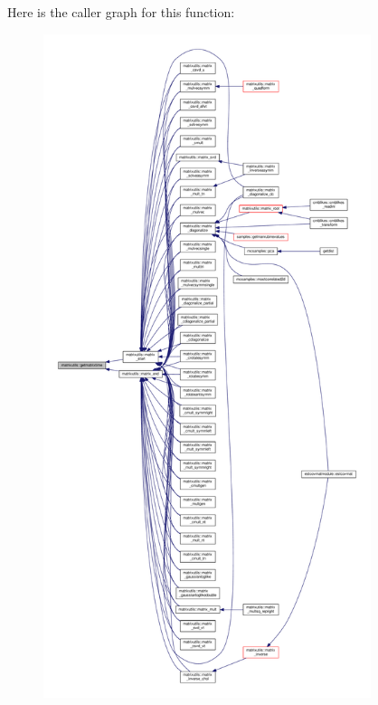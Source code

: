 Here is the caller graph for this function\+:
\nopagebreak
\begin{figure}[H]
\begin{center}
\leavevmode
\includegraphics[height=550pt]{namespacematrixutils_a969773017c47f3dc8dfb2a18e5bc5fbd_icgraph}
\end{center}
\end{figure}
\mbox{\label{namespacematrixutils_af41b3d5784e02032b5e22a16d76eca49}} 
